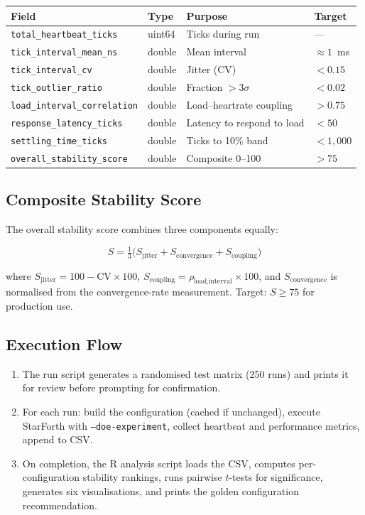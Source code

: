 \begin{center}
\begin{tabular}{llll}
\toprule
Field & Type & Purpose & Target \\
\midrule
\texttt{total\_heartbeat\_ticks} & uint64 & Ticks during run & --- \\
\texttt{tick\_interval\_mean\_ns} & double & Mean interval & $\approx 1$~ms \\
\texttt{tick\_interval\_cv} & double & Jitter (CV) & $< 0.15$ \\
\texttt{tick\_outlier\_ratio} & double & Fraction $> 3\sigma$ & $< 0.02$ \\
\texttt{load\_interval\_correlation} & double & Load--heartrate coupling & $> 0.75$ \\
\texttt{response\_latency\_ticks} & double & Latency to respond to load & $< 50$ \\
\texttt{settling\_time\_ticks} & double & Ticks to 10\% band & $< 1{,}000$ \\
\texttt{overall\_stability\_score} & double & Composite 0--100 & $> 75$ \\
\bottomrule
\end{tabular}
\end{center}

\subsection{Composite Stability Score}

The overall stability score combines three components equally:

\begin{equation}
  S = \tfrac{1}{3}\bigl(S_{\text{jitter}} + S_{\text{convergence}}
      + S_{\text{coupling}}\bigr)
\end{equation}

where $S_{\text{jitter}} = 100 - \mathrm{CV} \times 100$,
$S_{\text{coupling}} = \rho_{\text{load,interval}} \times 100$, and
$S_{\text{convergence}}$ is normalised from the convergence-rate measurement.
Target: $S \geq 75$ for production use.

\subsection{Execution Flow}

\begin{enumerate}
  \item The run script generates a randomised test matrix (250 runs) and
        prints it for review before prompting for confirmation.
  \item For each run: build the configuration (cached if unchanged), execute
        StarForth with \texttt{--doe-experiment}, collect heartbeat and
        performance metrics, append to CSV.
  \item On completion, the R analysis script loads the CSV, computes
        per-configuration stability rankings, runs pairwise $t$-tests for
        significance, generates six visualisations, and prints the golden
        configuration recommendation.
\end{enumerate}

